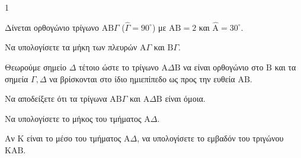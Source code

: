 \begin{ylh}{1}
    \item [Γεωμετρία]
\end{ylh}
\begin{figure}
    \vspace{-1em}
\end{figure}
Δίνεται ορθογώνιο τρίγωνο $\mathrm{AB}\Gamma$ ($\hat{\Gamma} = 90^\circ$) με $\mathrm{AB}=2$ και $\hat{\mathrm{A}}=30^\circ$.
\begin{alist}
    \item Να υπολογίσετε τα μήκη των πλευρών $\mathrm{A}\Gamma$ και $\mathrm{B}\Gamma$. 
    \item Θεωρούμε σημείο $\Delta$ τέτοιο ώστε το τρίγωνο $\mathrm{A}\Delta\mathrm{B}$ να είναι ορθογώνιο στο $\mathrm{B}$ και τα σημεία $\Gamma, \Delta$ να βρίσκονται στο ίδιο ημιεπίπεδο ως προς την ευθεία $\mathrm{AB}$.
        \begin{rlist}
            \item Να αποδείξετε ότι τα τρίγωνα $\mathrm{AB}\Gamma$ και $\mathrm{A}\Delta\mathrm{B}$ είναι όμοια. 
            \item Να υπολογίσετε το μήκος του τμήματος $\mathrm{A}\Delta$. 
        \end{rlist}
    \item Αν $\mathrm{K}$ είναι το μέσο του τμήματος $\mathrm{A}\Delta$, να υπολογίσετε το εμβαδόν του τριγώνου $\mathrm{KAB}$. 
\end{alist}